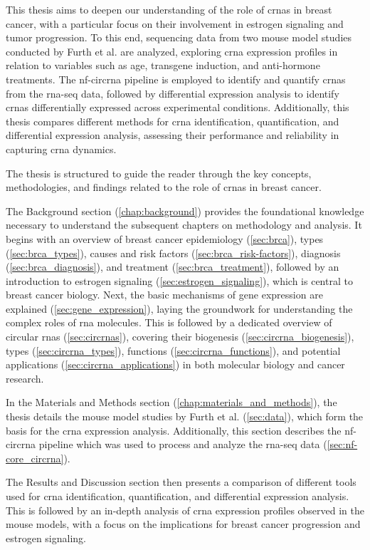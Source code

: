 This thesis aims to deepen our understanding of the role of \glspl{crna} in
breast cancer, with a particular focus on their involvement in estrogen
signaling and tumor progression.
To this end, sequencing data from two mouse model studies conducted by Furth et
al.
\supercite{furth_esr1_2023,furth_overexpression_2023}
are analyzed, exploring \gls{crna} expression profiles in relation to variables
such as age, transgene induction, and anti-hormone treatments.
The \gls{nf-circrna} pipeline\supercite{digby_nf-corecircrna_2023} is employed
to identify and quantify \glspl{crna} from the \gls{rna-seq} data, followed by
differential expression analysis to identify \glspl{crna} differentially
expressed across experimental conditions.
Additionally, this thesis compares different methods for \gls{crna}
identification, quantification, and differential expression analysis, assessing
their performance and reliability in capturing \gls{crna} dynamics.

\medskip
\noindent The thesis is structured to guide the reader through the key
concepts,
methodologies, and findings related to the role of \glspl{crna} in breast
cancer.

The Background section (\cref{chap:background}) provides the foundational
knowledge necessary to understand the subsequent chapters on methodology and
analysis.
It begins with an overview of breast cancer epidemiology (\cref{sec:brca}),
types (\cref{sec:brca_types}), causes and risk factors
(\cref{sec:brca_risk-factors}), diagnosis (\cref{sec:brca_diagnosis}), and
treatment (\cref{sec:brca_treatment}), followed by an introduction to estrogen
signaling (\cref{sec:estrogen_signaling}), which is central to breast cancer
biology.
Next, the basic mechanisms of gene expression are explained
(\cref{sec:gene_expression}), laying the groundwork for understanding the
complex roles of \gls{rna} molecules.
This is followed by a dedicated overview of circular \glspl{rna}
(\cref{sec:circrnas}), covering their biogenesis
(\cref{sec:circrna_biogenesis}), types (\cref{sec:circrna_types}), functions
(\cref{sec:circrna_functions}), and potential applications
(\cref{sec:circrna_applications}) in both molecular biology and cancer
research.

In the Materials and Methods section (\cref{chap:materials_and_methods}), the
thesis details the mouse model studies by Furth et al.
\supercite{furth_esr1_2023,furth_overexpression_2023} (\cref{sec:data}),
which form the basis for the \gls{crna} expression
analysis.
Additionally, this section describes the \gls{nf-circrna}
pipeline\supercite{digby_nf-corecircrna_2023} which was used to process and
analyze the \gls{rna-seq} data (\cref{sec:nf-core_circrna}).

The Results and Discussion section then presents a comparison of different
tools used for \gls{crna} identification, quantification, and differential
expression analysis.
This is followed by an in-depth analysis of \gls{crna} expression profiles
observed in the mouse models, with a focus on the implications for breast
cancer progression and estrogen signaling.
